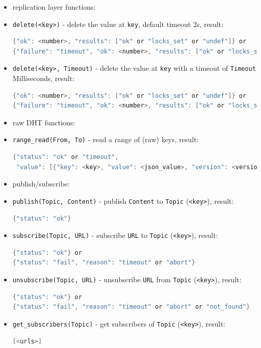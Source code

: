 \documentclass[a4paper]{scrreprt}
\newcommand{\code}[1]{\lstinline[basicstyle=\ttfamily]!#1!}
\begin{document}
\begin{itemize}
  \item[] \hspace{-1.7em}replication layer functions:
  \item \code{delete(<key>)} - delete the value at \code{key}, default timeout 2s, result:
\begin{lstlisting}[language=java]
{"ok": <number>, "results": ["ok" or "locks_set" or "undef"]} or
{"failure": "timeout", "ok": <number>, "results": ["ok" or "locks_set" or "undef"]}
\end{lstlisting}
  \item \code{delete(<key>, Timeout)} - delete the value at \code{key} with a timeout of \code{Timeout} Milliseconds, result:
\begin{lstlisting}[language=java]
{"ok": <number>, "results": ["ok" or "locks_set" or "undef"]} or
{"failure": "timeout", "ok": <number>, "results": ["ok" or "locks_set" or "undef"]}
\end{lstlisting}
  \item[] \hspace{-1.7em}raw DHT functions:
  \item \code{range_read(From, To)} - read a range of (raw) keys, result:
\begin{lstlisting}[language=java]
{"status": "ok" or "timeout",
 "value": [{"key": <key>, "value": <json_value>, "version": <version>}]}
\end{lstlisting}
  \item[] \hspace{-1.7em}publish/subscribe:
  \item \code{publish(Topic, Content)} - publish \code{Content} to \code{Topic} (\code{<key>}), result:
\begin{lstlisting}[language=java]
{"status": "ok"}
\end{lstlisting}
  \item \code{subscribe(Topic, URL)} - subscribe \code{URL} to \code{Topic} (\code{<key>}), result:
\begin{lstlisting}[language=java]
{"status": "ok"} or
{"status": "fail", "reason": "timeout" or "abort"}
\end{lstlisting}
  \item \code{unsubscribe(Topic, URL)} - unsubscribe \code{URL} from \code{Topic} (\code{<key>}), result:
\begin{lstlisting}[language=java]
{"status": "ok"} or
{"status": "fail", "reason": "timeout" or "abort" or "not_found"}
\end{lstlisting}
  \item \code{get_subscribers(Topic)} - get subscribers of \code{Topic} (\code{<key>}), result:
\begin{lstlisting}[language=java]
[<urls>]
\end{lstlisting}
\end{itemize}
\end{document}
